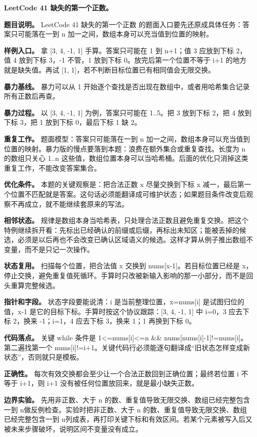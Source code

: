 \noindent\textbf{LeetCode 41 缺失的第一个正数。}

\textbf{题目说明。} LeetCode 41 缺失的第一个正数 的题面入口要先还原成具体任务：答案只可能落在一到 n 加一之间，数组本身可以充当值到位置的映射。

\textbf{样例入口。} 拿 [3, 4, -1, 1] 手算。答案只可能在 1 到 n+1；值 3 应放到下标 2，值 4 放到下标 3，-1 不管，1 放到下标 0。放完后第一个位置不等于 i+1 的地方就是缺失值。再试 [1, 1]，若不判断目标位置已有相同值会无限交换。

\textbf{暴力基线。} 暴力可以从 1 开始逐个查找是否出现在数组中，或者用哈希集合记录所有正数后再查。

\textbf{暴力过程。} 以 [3, 4, -1, 1] 为例，答案只可能在 1..5。把 3 放到下标 2，把 4 放到下标 3，把 1 放到下标 0，最后下标 1 缺 2。

\textbf{重复工作。} 题面模型：答案只可能落在一到 n 加一之间，数组本身可以充当值到位置的映射。暴力版的慢点要落到本题：浪费在额外集合或重复查找。长度为 n 的数组只关心 1..n 这些值，数组位置本身可以当哈希桶。后面的优化只消掉这类重复工作，不能改变答案集合。

\textbf{优化条件。} 本题的关键观察是：把合法正数 x 尽量交换到下标 x 减一，最后第一个位置不匹配就是答案。这句话必须能翻译成可维护状态；如果题目条件改变后观察不再成立，就不能继续套原来的写法。

\textbf{相邻状态。} 规律是数组本身当哈希表，只处理合法正数且避免重复交换。把这个特例继续拆开看：先标出已经确认的前缀或后缀，再标出未知区；能被丢掉的候选，必须是以后再也不会改变已确认区域语义的候选。这样才算从例子推出数组不变量，而不是只记一次操作。

\textbf{状态复用。} 扫描每个位置，把合法值 x 交换到 nums[x-1]。若目标位置已经是 x，停止交换，避免重复值死循环。手算时只改被新输入影响的那一小部分，而不是回头重算完整候选。

\textbf{指针和字段。} 状态字段要能说清：i 是当前整理位置，x=nums[i] 是试图归位的值，x-1 是它的目标下标。手算时按这个协议跟踪：[3, 4, -1, 1] 中 i=0，3 应去下标 2，换来 -1；i=1，4 应去下标 3，换来 1；1 再换到下标 0。

\textbf{代码落点。} 关键 while 条件是 1<=nums[i]<=n \&\& nums[nums[i]-1]!=nums[i]。第二遍找第一个 nums[i]!=i+1。关键代码行必须能逐句翻译成“旧状态怎样变成新状态”，否则就只是模板。

\textbf{正确性。} 每次有效交换都会至少让一个合法正数回到正确位置；最终若位置 i 不等于 i+1，则 i+1 没有被任何位置放回来，就是最小缺失正数。

\textbf{边界实验。} 先用非正数、大于 n 的数、重复值导致无限交换、数组已经完整包含一到 n做反例检查。实验时把非正数、大于 n 的数、重复值导致无限交换、数组已经完整包含一到 n列成表，再打印关键下标和有效区间。若某个元素被写入后又被未来步骤破坏，说明区间不变量没有成立。

